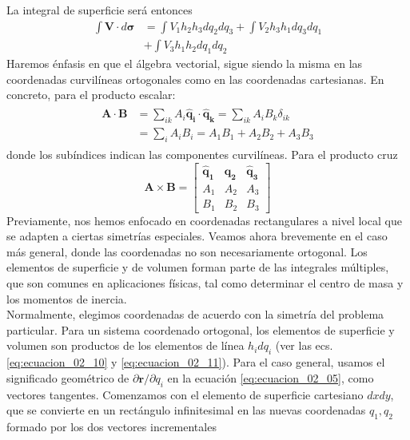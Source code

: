 La integral de superficie será entonces
\[ \begin{split}
\int \mathbf{V} \cdot d \bm{\sigma} &= \int V_{1} h_{2} h_{3} d q_{2} d q_{3} + \int V_{2} h_{3} h_{1} d q_{3} d q_{1} \\
&+ \int V_{3} h_{1} h_{2} d q_{1} d q_{2}  \end{split} \]
Haremos énfasis en que el álgebra vectorial, sigue siendo la misma en las coordenadas curvilíneas ortogonales como en las coordenadas cartesianas. En concreto, para el producto escalar:
\begin{eqnarray}
\begin{aligned}
\mathbf{A} \cdot \mathbf{B} &= \sum_{ik} A_{i} \mathbf{\widehat{q}_{i}} \cdot \mathbf{\widehat{q}_{k}} = \sum_{ik} A_{i}B_{k} \delta_{ik} \\
&= \sum_{i} A_{i} B_{i} = A_{1}B_{1} + A_{2} B_{2} + A_{3} B_{3}
\end{aligned}
\label{eq:ecuacion_02_12}
\end{eqnarray}
donde los subíndices indican las componentes curvilíneas. Para el producto cruz
\begin{equation}
\mathbf{A} \times \mathbf{B} = \begin{bmatrix}
\mathbf{\widehat{q}_{1}} & \mathbf{\widehat{q}_{2}} & \mathbf{\widehat{q}_{3}} \\
A_{1} & A_{2} & A_{3} \\
B_{1} & B_{2} & B_{3}
\end{bmatrix}
\label{eq:ecuacion_02_13}
\end{equation}
Previamente, nos hemos enfocado en coordenadas rectangulares a nivel local que se adapten a ciertas simetrías especiales. Veamos ahora brevemente en el caso más general, donde las coordenadas no son necesariamente ortogonal. Los elementos de superficie y de volumen forman parte de las integrales múltiples, que son comunes en aplicaciones físicas, tal como determinar el centro de masa y los momentos de inercia.
\\
Normalmente, elegimos coordenadas de acuerdo con la simetría del problema particular. Para un sistema coordenado ortogonal, los elementos de superficie y volumen son productos de los elementos de línea $h_{i} dq_{i}$ (ver las ecs. \ref{eq:ecuacion_02_10} y \ref{eq:ecuacion_02_11}). Para el caso general, usamos el significado geométrico de $\partial \mathbf{r} / \partial q_{i}$ en la ecuación \ref{eq:ecuacion_02_05}, como vectores tangentes. Comenzamos con el elemento de superficie cartesiano $dx dy$, que se convierte en un rectángulo infinitesimal en las nuevas coordenadas $q_{1}, q_{2}$  formado por los dos vectores incrementales
